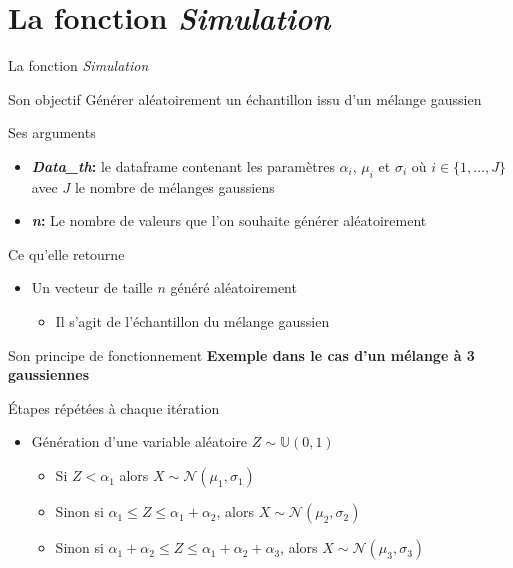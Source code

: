 \documentclass[11pt]{beamer}
\begin{document}
\section{La fonction \textit{Simulation}}
	
	\begin{frame}{La fonction \textit{Simulation}}
		\begin{block}{Son objectif}
			\small
			Générer aléatoirement un échantillon issu 
			d'un mélange gaussien
		\end{block}
		\begin{block}{Ses arguments}
			\begin{itemize}
				\small
				\item \textbf{\textit{Data\_th}:} le dataframe contenant les paramètres $\alpha_i$, $\mu_i$ et $\sigma_i$ où $i \in \{1, \dots ,J\}$ avec $J$ le nombre de mélanges gaussiens\\
				\item \textbf{\textit{n}:} Le nombre de valeurs que l'on souhaite générer aléatoirement
			\end{itemize}
		\end{block}
		\begin{block}{Ce qu'elle retourne}
			\begin{itemize}
				\small
				\item Un vecteur de taille $n$ généré aléatoirement
				\begin{itemize}
					\item Il s'agit de l'échantillon du mélange gaussien
				\end{itemize}
			\end{itemize}
		\end{block}
	\end{frame}
	\begin{frame}{Son principe de fonctionnement}
		\textbf{Exemple dans le cas d'un mélange à 3 gaussiennes}
		\begin{block}{Étapes répétées à chaque itération}
			\begin{itemize}
				\item Génération d'une variable aléatoire $Z \sim \mathbb{U}(0,1)$
				\begin{itemize}
					\item Si $Z < \alpha_1$ alors $X \sim \mathcal{N}(\mu_1, \sigma_1)$ \\
					\item Sinon si $\alpha_1 \leq Z \leq \alpha_1 + \alpha_2$, alors $X \sim \mathcal{N}(\mu_2, \sigma_2)$ \\
					\item Sinon si  $\alpha_1 + \alpha_2 \leq Z \leq \alpha_1 + \alpha_2 + \alpha_3$, alors $X \sim \mathcal{N}(\mu_3, \sigma_3)$
				\end{itemize}
			\end{itemize}
		\end{block}
	\end{frame}
	
\end{document}
